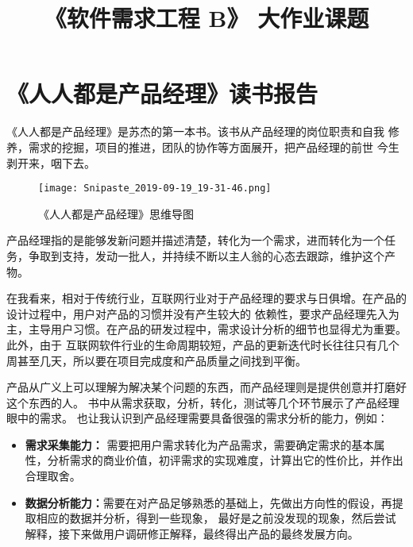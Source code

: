 \documentclass[withoutpreface,bwprint]{cumcmthesis} %
\title{《软件需求工程 B》 大作业课题}
\begin{document}

 
\newpage
\tableofcontents

\newpage

\section{《人人都是产品经理》读书报告}

《人人都是产品经理》是苏杰的第一本书。该书从产品经理的岗位职责和自我
修养，需求的挖掘，项目的推进，团队的协作等方面展开，把产品经理的前世
今生剥开来，咽下去。
\begin{figure}[H]
	\centering
	\texttt{[image: Snipaste\_2019-09-19\_19-31-46.png]}
	\caption{ 《人人都是产品经理》思维导图 \label{fig:1}}
\end{figure}

产品经理指的是能够发新问题并描述清楚，转化为一个需求，进而转化为一个任务，争取到支持，发动一批人，并持续不断以主人翁的心态去跟踪，维护这个产物。

在我看来，相对于传统行业，互联网行业对于产品经理的要求与日俱增。在产品的设计过程中，用户对产品的习惯并没有产生较大的
依赖性，要求产品经理先入为主，主导用户习惯。在产品的研发过程中，需求设计分析的细节也显得尤为重要。此外，由于
互联网软件行业的生命周期较短，产品的更新迭代时长往往只有几个周甚至几天，所以要在项目完成度和产品质量之间找到平衡。

产品从广义上可以理解为解决某个问题的东西，而产品经理则是提供创意并打磨好这个东西的人。
书中从需求获取，分析，转化，测试等几个环节展示了产品经理眼中的需求。
也让我认识到产品经理需要具备很强的需求分析的能力，例如：
\begin{itemize}
\item \textbf{需求采集能力：} 需要把用户需求转化为产品需求，需要确定需求的基本属性，分析需求的商业价值，初评需求的实现难度，计算出它的性价比，并作出合理取舍。
\item \textbf{数据分析能力：}需要在对产品足够熟悉的基础上，先做出方向性的假设，再提取相应的数据并分析，得到一些现象， 最好是之前没发现的现象，然后尝试解释，接下来做用户调研修正解释，最终得出产品的最终发展方向。
\end{itemize}
\end{document}
